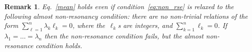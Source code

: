 \documentclass[final ]{IEEEtran}
\newtheorem{example}{Example}
\newtheorem{remark}{Remark}
\newcommand {\R}{\mathbb R}
\begin{document}
\begin{remark}
Eq.~\eqref{mean} holds even if condition~\eqref{eq:non_rse} is relaxed to  the following {\em almost non-resonancy} condition: there  are no non-trivial relations of the form $\sum_{\ell=1}^n \lambda_k \ell_k=0$, where
the~$\ell_k$s are integers, and $\sum_{k=1}^n \ell_k=0$. If~$\lambda_1=\dots=\lambda_n$
then the non-resonance condition fails, but the almost non-resonance condition holds. 
\end{remark}

\end{document}
